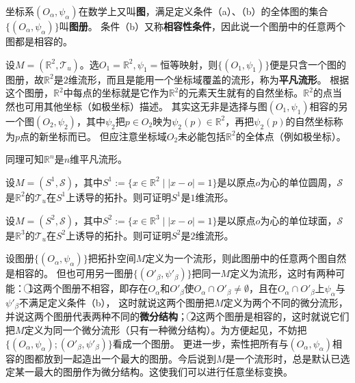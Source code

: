 \begin{definition}
坐标系$(O_\alpha, \psi_\alpha)$在数学上又叫\textbf{图}，满足定义条件（a）、（b）的全体图的集合$\{(O_\alpha, \psi_\alpha)\}$叫\textbf{图册}。
条件（b）又称\textbf{相容性条件}，因此说一个图册中的任意两个图都是相容的。
\end{definition}

\begin{example}
设$M = (\mathbb{R}^2, \mathscr{T}_u)$。选$O_1 = \mathbb{R}^2, \psi_1 =\text{恒等映射}$，则$\{(O_1, \psi_1)\}$便是只含一个图的图册，故$\mathbb{R}^2$是$2$维流形，而且是能用一个坐标域覆盖的流形，称为\textbf{平凡流形}。
根据这个图册，$\mathbb{R}^2$中每点的坐标就是它作为$\mathbb{R}^2$的元素天生就有的自然坐标。$\mathbb{R}^2$的点当然也可用其他坐标（如极坐标）描述。
其实这无非是选择与图$(O_1, \psi_1)$相容的另一个图$(O_2, \psi_2)$，其中$\psi_2$把$p \in O_2$映为$\psi_2(p) \in \mathbb{R}^2$，再把$\psi_2(p)$的自然坐标称为$p$点的新坐标而已。
但应注意坐标域$O_2$未必能包括$\mathbb{R}^2$的全体点（例如极坐标）。

同理可知$\mathbb{R}^n$是$n$维平凡流形。
\end{example}

\begin{example}
设$M = (S^1, \mathscr{S})$，其中$S^1 := \{x \in \mathbb{R}^2 \mid |x - o| = 1\}$是以原点$o$为心的单位圆周，$\mathscr{S}$是$\mathbb{R}^2$的$\mathscr{T}_u$在$S^1$上诱导的拓扑。则可证明$S^1$是$1$维流形。
\end{example}

\begin{example}
设$M = (S^2, \mathscr{S})$，其中$S^2 := \{x \in \mathbb{R}^3 \mid |x - o| = 1\}$是以原点$o$为心的单位球面，$\mathscr{S}$是$\mathbb{R}^3$的$\mathscr{T}_u$在$S^2$上诱导的拓扑。则可证明$S^2$是$2$维流形。
\end{example}

设图册$\{(O_\alpha, \psi_\alpha)\}$把拓扑空间$M$定义为一个流形，则此图册中的任意两个图自然是相容的。
但也可用另一图册$\{(O'_\beta, \psi'_\beta)\}$把同一$M$定义为流形，这时有两种可能：
\textcircled{1}这两个图册不相容，即存在$O_\alpha$和$O'_\beta$使$O_\alpha \cap O'_\beta \neq \emptyset$，且在$O_\alpha \cap O'_\beta$上$\psi_\alpha$与$\psi'_\beta$不满足定义条件（b），
这时就说这两个图册把$M$定义为两个不同的微分流形，并说这两个图册代表两种不同的\textbf{微分结构}；
\textcircled{2}这两个图册是相容的，这时就说它们把$M$定义为同一个微分流形（只有一种微分结构）。为方便起见，不妨把$\{(O_\alpha, \psi_\alpha); (O'_\beta, \psi'_\beta)\}$看成一个图册。
更进一步，索性把所有与$(O_\alpha, \psi_\alpha)$相容的图都放到一起造出一个最大的图册。今后说到$M$是一个流形时，总是默认已选定某一最大的图册作为微分结构。这使我们可以进行任意坐标变换。

